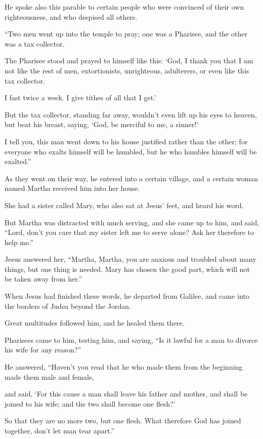 He spoke also this parable to certain people who were convinced of their own righteousness, and who despised all others.

“Two men went up into the temple to pray; one was a Pharisee, and the other was a tax collector.

The Pharisee stood and prayed to himself like this: ‘God, I thank you that I am not like the rest of men, extortionists, unrighteous, adulterers, or even like this tax collector.

I fast twice a week. I give tithes of all that I get.’

But the tax collector, standing far away, wouldn’t even lift up his eyes to heaven, but beat his breast, saying, ‘God, be merciful to me, a sinner!’

I tell you, this man went down to his house justified rather than the other; for everyone who exalts himself will be humbled, but he who humbles himself will be exalted.”

As they went on their way, he entered into a certain village, and a certain woman named Martha received him into her house.

She had a sister called Mary, who also sat at Jesus’ feet, and heard his word.

But Martha was distracted with much serving, and she came up to him, and said, “Lord, don’t you care that my sister left me to serve alone? Ask her therefore to help me.”

Jesus answered her, “Martha, Martha, you are anxious and troubled about many things, but one thing is needed. Mary has chosen the good part, which will not be taken away from her.”

When Jesus had finished these words, he departed from Galilee, and came into the borders of Judea beyond the Jordan.

Great multitudes followed him, and he healed them there.

Pharisees came to him, testing him, and saying, “Is it lawful for a man to divorce his wife for any reason?”

He answered, “Haven’t you read that he who made them from the beginning made them male and female,

and said, ‘For this cause a man shall leave his father and mother, and shall be joined to his wife; and the two shall become one flesh?’

So that they are no more two, but one flesh. What therefore God has joined together, don’t let man tear apart.”

